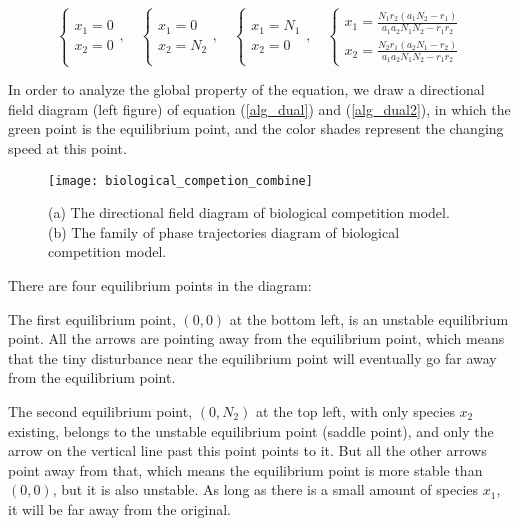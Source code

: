 \documentclass{mcmthesis}
\begin{document}
\begin{equation}
  \left\{\begin{array}{l}
    x_{1}=0 \\
    x_{2}=0
    \end{array}, \quad\left\{\begin{array}{l}
    x_{1}=0 \\
    x_{2}=N_{2}
    \end{array}, \quad\left\{\begin{array}{l}
    x_{1}=N_{1} \\
    x_{2}=0
    \end{array}, \quad\left\{\begin{array}{l}
    x_{1}=\frac{N_{1} r_{2}\left(a_{1} N_{2}-r_{1}\right)}{a_{1} a_{2} N_{1} N_{2}-r_{1} r_{2}} \\
    x_{2}=\frac{N_{2} r_{1}\left(a_{2} N_{1}-r_{2}\right)}{a_{1} a_{2} N_{1} N_{2}-r_{1} r_{2}}
    \end{array}\right.\right.\right.\right.
\end{equation}

In order to analyze the global property of the equation, we draw a directional field diagram (left figure) of equation (\ref{alg_dual}) and (\ref{alg_dual2}), in which the green point is the equilibrium point, and the color shades represent the changing speed at this point.

\begin{figure}[H]
  \small
  \centering
  \texttt{[image: biological\_competion\_combine]}
  \caption{(a) The directional field diagram of biological competition model. (b) The family of phase trajectories diagram of biological competition model.}
  \label{biological_competion_combine}
\end{figure}

There are four equilibrium points in the diagram:

The first equilibrium point, $ (0,0) $ at the bottom left, is an unstable equilibrium point. All the arrows are pointing away from the equilibrium point, which means that the tiny disturbance near the equilibrium point will eventually go far away from the equilibrium point. 

The second equilibrium point, $(0,N_2) $ at the top left, with only species  $ x_2 $ existing, belongs to the unstable equilibrium point (saddle point), and only the arrow on the vertical line past this point points to it. But all the other arrows point away from that, which means the equilibrium point is more stable than $ (0,0) $, but it is also unstable. As long as there is a small amount of species $ x_1 $, it will be far away from the original.
\end{document}
